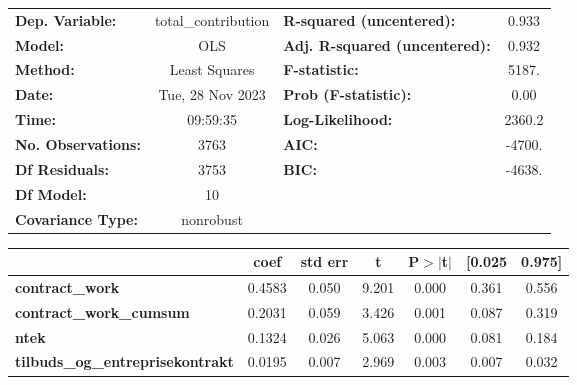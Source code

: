\begin{center}
\begin{tabular}{lclc}
\toprule
\textbf{Dep. Variable:}                  & total\_contribution & \textbf{  R-squared (uncentered):}      &     0.933   \\
\textbf{Model:}                          &         OLS         & \textbf{  Adj. R-squared (uncentered):} &     0.932   \\
\textbf{Method:}                         &    Least Squares    & \textbf{  F-statistic:       }          &     5187.   \\
\textbf{Date:}                           &   Tue, 28 Nov 2023  & \textbf{  Prob (F-statistic):}          &     0.00    \\
\textbf{Time:}                           &       09:59:35      & \textbf{  Log-Likelihood:    }          &    2360.2   \\
\textbf{No. Observations:}               &          3763       & \textbf{  AIC:               }          &    -4700.   \\
\textbf{Df Residuals:}                   &          3753       & \textbf{  BIC:               }          &    -4638.   \\
\textbf{Df Model:}                       &            10       & \textbf{                     }          &             \\
\textbf{Covariance Type:}                &      nonrobust      & \textbf{                     }          &             \\
\bottomrule
\end{tabular}
\begin{tabular}{lcccccc}
                                         & \textbf{coef} & \textbf{std err} & \textbf{t} & \textbf{P$> |$t$|$} & \textbf{[0.025} & \textbf{0.975]}  \\
\midrule
\textbf{contract\_work}                  &       0.4583  &        0.050     &     9.201  &         0.000        &        0.361    &        0.556     \\
\textbf{contract\_work\_cumsum}          &       0.2031  &        0.059     &     3.426  &         0.001        &        0.087    &        0.319     \\
\textbf{ntek}                            &       0.1324  &        0.026     &     5.063  &         0.000        &        0.081    &        0.184     \\
\textbf{tilbuds\_og\_entreprisekontrakt} &       0.0195  &        0.007     &     2.969  &         0.003        &        0.007    &        0.032     \\

\end{tabular}
\end{center}
